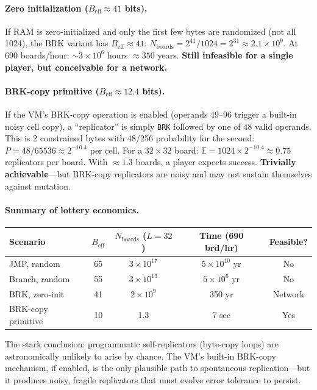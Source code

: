 \documentclass{article}
\newcommand{\opcode}[1]{\texttt{#1}}
\newcommand{\Beff}{B_{\mathrm{eff}}}
\begin{document}
\paragraph{Zero initialization ($\Beff \approx 41$ bits).}
If RAM is zero-initialized and only the first few bytes are randomized
(not all 1024), the BRK variant has $\Beff \approx 41$:
$N_{\text{boards}} = 2^{41} / 1024 = 2^{31} \approx 2.1 \times 10^9$.
At 690 boards/hour: $\sim 3 \times 10^6$ hours $\approx 350$ years.
\textbf{Still infeasible for a single player, but conceivable for a
network.}

\paragraph{BRK-copy primitive ($\Beff \approx 12.4$ bits).}
If the VM's BRK-copy operation is enabled (operands 49--96 trigger
a built-in noisy cell copy), a ``replicator'' is simply \opcode{BRK}
followed by one of 48 valid operands. This is 2 constrained bytes
with 48/256 probability for the second: $P = 48/65536 \approx
2^{-10.4}$ per cell. For a $32 \times 32$ board:
$\mathbb{E} = 1024 \times 2^{-10.4} \approx 0.75$ replicators per
board. With $\approx 1.3$ boards, a player expects success.
\textbf{Trivially achievable}---but BRK-copy replicators are noisy
and may not sustain themselves against mutation.

\paragraph{Summary of lottery economics.}

\begin{center}
\begin{tabular}{lcccc}
\toprule
Scenario & $\Beff$ & $N_{\text{boards}}$ ($L\!=\!32$) &
  Time (690 brd/hr) & Feasible? \\
\midrule
JMP, random      & 65 & $3 \times 10^{17}$ & $5 \times 10^{10}$ yr & No \\
Branch, random   & 55 & $3 \times 10^{13}$ & $5 \times 10^{6}$ yr & No \\
BRK, zero-init   & 41 & $2 \times 10^{9}$  & 350 yr & Network \\
BRK-copy primitive & 10 & 1.3 & 7 sec & Yes \\
\bottomrule
\end{tabular}
\end{center}

The stark conclusion: programmatic self-replicators (byte-copy loops)
are astronomically unlikely to arise by chance. The VM's built-in
BRK-copy mechanism, if enabled, is the only plausible path to
spontaneous replication---but it produces noisy, fragile replicators
that must evolve error tolerance to persist.
\end{document}
